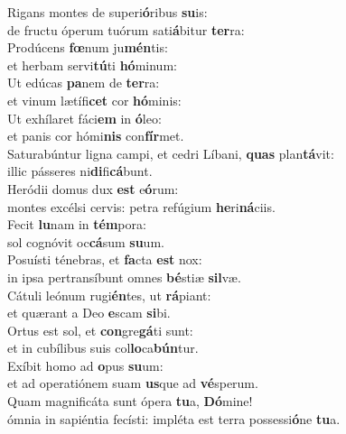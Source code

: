 \evenverse Rigans montes de superi\textbf{ó}ribus \textbf{su}is:~\*\\
\evenverse de fructu óperum tuórum sati\textbf{á}bitur \textbf{ter}ra:\\
\oddverse Prodúcens \textbf{fœ}num ju\textbf{mén}tis:~\*\\
\oddverse et herbam servi\textbf{tú}ti \textbf{hó}minum:\\
\evenverse Ut edúcas \textbf{pa}nem de \textbf{ter}ra:~\*\\
\evenverse et vinum lætífi\textbf{cet} cor \textbf{hó}minis:\\
\oddverse Ut exhílaret fáci\textbf{em} in \textbf{ó}leo:~\*\\
\oddverse et panis cor hómi\textbf{nis} con\textbf{fír}met.\\
\evenverse Saturabúntur ligna campi, et cedri Líbani, \textbf{quas} plan\textbf{tá}vit:~\*\\
\evenverse illic pásseres ni\textbf{di}fi\textbf{cá}bunt.\\
\oddverse Heródii domus dux \textbf{est} e\textbf{ó}rum:~\*\\
\oddverse montes excélsi cervis: petra refúgium \textbf{he}ri\textbf{ná}ciis.\\
\evenverse Fecit \textbf{lu}nam in \textbf{tém}pora:~\*\\
\evenverse sol cognóvit oc\textbf{cá}sum \textbf{su}um.\\
\oddverse Posuísti ténebras, et \textbf{fa}cta \textbf{est} nox:~\*\\
\oddverse in ipsa pertransíbunt omnes \textbf{bé}stiæ \textbf{sil}væ.\\
\evenverse Cátuli leónum rugi\textbf{én}tes, ut \textbf{rá}piant:~\*\\
\evenverse et quærant a Deo \textbf{e}scam \textbf{si}bi.\\
\oddverse Ortus est sol, et \textbf{con}gre\textbf{gá}ti sunt:~\*\\
\oddverse et in cubílibus suis col\textbf{lo}ca\textbf{bún}tur.\\
\evenverse Exíbit homo ad \textbf{o}pus \textbf{su}um:~\*\\
\evenverse et ad operatiónem suam \textbf{us}que ad \textbf{vé}sperum.\\
\oddverse Quam magnificáta sunt ópera \textbf{tu}a, \textbf{Dó}mine!~\*\\
\oddverse ómnia in sapiéntia fecísti: impléta est terra possessi\textbf{ó}ne \textbf{tu}a.\\
